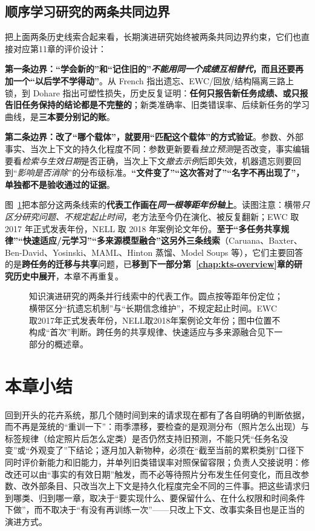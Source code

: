 \subsection{顺序学习研究的两条共同边界}
\label{sec:ket-overview-history-lessons}

把上面两条历史线索合起来看，长期演进研究始终被两条共同边界约束，它们也直接对应第11章的评价设计：

\textbf{第一条边界：“学会新的”和“记住旧的”\emph{不能用同一个成绩互相替代}，而且还要再加一个“以后学不学得动”}。从 French 指出遗忘、EWC/回放/结构隔离三路上锁，到 Dohare 指出可塑性损失，历史反复证明：\textbf{任何只报告新任务成绩、或只报告旧任务保持的结论都是不完整的}；新类准确率、旧类错误率、后续新任务的学习曲线，是\textbf{三本要分别记的账}。

\textbf{第二条边界：改了“哪个载体”，就要用“匹配这个载体”的方式验证}。参数、外部事实、当次上下文的持久化程度不同：参数更新要看\emph{独立预测}是否改变，事实编辑要看\emph{检索与生效日期}是否正确，当次上下文\emph{撤去示例}后即失效，机器遗忘则要回到“\emph{影响是否消除}”的分布级标准。\textbf{“文件变了”“这次答对了”“名字不再出现了”，单独都不是验收通过的证据}。

图~\ref{fig:ket-overview-history}把本部分这两条线索的\textbf{代表工作}\textbf{画在\emph{同一根等距年份轴}上}。读图注意：横带\emph{只区分研究问题、不规定起止时间}，老方法至今仍在演化、被反复翻新；EWC 取 2017 年正式发表年份，NELL 取 2018 年案例论文年份。\textbf{至于“多任务共享规律”“快速适应/元学习”“多来源模型融合”这另外三条线索}（Caruana、Baxter、Ben-David、Yosinski、MAML、Hinton 蒸馏、Model Soups 等），它们主要回答的是\textbf{跨任务的迁移与共享}问题，已\textbf{移到下一部分第~\ref{chap:kts-overview}章的研究历史中展开}，本章不再重复。

\begin{figure}[htbp]
  \centering
  
  \caption{知识演进研究的两条并行线索中的代表工作。圆点按等距年份定位；横带区分“抗遗忘机制”与“长期信念维护”，不规定起止时间。EWC取2017年正式发表年份，NELL取2018年案例论文年份；图中位置不构成“首次”判断。跨任务的共享规律、快速适应与多来源融合见下一部分的概述章。}
  \label{fig:ket-overview-history}
\end{figure}

\section{本章小结}
\label{sec:ket-overview-summary}

回到开头的花卉系统，那几个随时间到来的请求现在都有了各自明确的判断依据，而不再是笼统的“重训一下”：雨季漂移，要检查的是观测分布（照片怎么出现）与标签规律（给定照片后怎么定类）是否仍然支持旧预测，不能只凭“任务名没变”或“外观变了”下结论；逐月加入新物种，必须在“截至当前的累积类别”口径下同时评价新能力和旧能力，并单列旧类错误率对照保留容限；负责人交接说明：修改还可以由“事实的有效日期”触发，而不必等待照片分布发生任何变化，而且改参数、改外部条目、只改当次上下文是持久化程度完全不同的三件事。把这些请求归到哪类、归到哪一章，取决于“要实现什么、要保留什么、在什么权限和时间条件下做”，而不取决于“有没有再训练一次”——只改上下文、改事实条目也是正当的演进方式。


